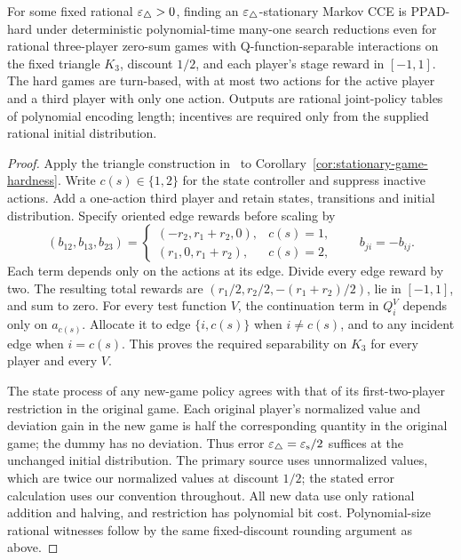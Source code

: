 \begin{corollary}
\label{cor:triangle-stationary-hardness}
For some fixed rational $\varepsilon_{\triangle}>0$, finding an
$\varepsilon_{\triangle}$-stationary Markov CCE is PPAD-hard under deterministic
polynomial-time many-one search reductions even for rational three-player
zero-sum games with Q-function-separable interactions on the fixed
triangle $K_3$, discount $1/2$, and each player's stage reward in $[-1,1]$.
The hard games are turn-based, with at most two actions for the active
player and a third player with only one action. Outputs are rational
joint-policy tables of polynomial encoding length; incentives are
required only from the supplied rational initial distribution.
\end{corollary}

\begin{proof}
Apply the triangle construction in~\cite[Appendix~C, Case~1]{PZO2025}
to Corollary~\ref{cor:stationary-game-hardness}.
Write $c(s)\in\{1,2\}$ for the state controller and suppress inactive
actions. Add a one-action third player and retain states, transitions
and initial distribution. Specify oriented edge rewards before scaling by
\[
 (b_{12},b_{13},b_{23})=
 \begin{cases}
 (-r_2,r_1+r_2,0),&c(s)=1,\\
 (r_1,0,r_1+r_2),&c(s)=2,
 \end{cases}
 \qquad b_{ji}=-b_{ij}.
\]
Each term depends only on the actions at its edge. Divide every edge
reward by two. The resulting total rewards are
$(r_1/2,r_2/2,-(r_1+r_2)/2)$, lie in $[-1,1]$, and sum to zero.
For every test function $V$, the continuation term in $Q_i^V$ depends
only on $a_{c(s)}$. Allocate it to edge $\{i,c(s)\}$ when $i\ne c(s)$,
and to any incident edge when $i=c(s)$. This proves the required
separability on $K_3$ for every player and every $V$.

The state process of any new-game policy agrees with that of its
first-two-player restriction in the original game. Each original
player's normalized value and deviation gain in the new game is half
the corresponding quantity in the original game; the dummy has no
deviation. Thus error
$\varepsilon_{\triangle}=\varepsilon_{\rm s}/2$ suffices at the unchanged initial
distribution. The primary source uses unnormalized values, which are
twice our normalized values at discount $1/2$; the stated error
calculation uses our convention throughout. All new data use only
rational addition and halving, and restriction has polynomial bit cost.
Polynomial-size rational witnesses follow by the same fixed-discount
rounding argument as above.
\end{proof}

